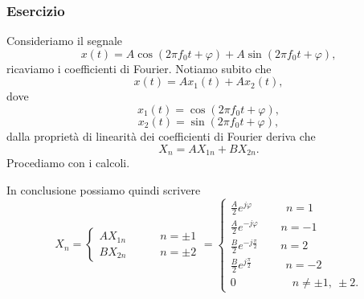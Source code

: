 \documentclass[12pt,oneside,openany]{memoir}
\numberwithin{equation}{subsection}
\begin{document}
\subsubsection{Esercizio}
Consideriamo il segnale
\begin{equation}
	x(t) = A \cos(2 \pi f_0 t + \varphi) + A \sin(2 \pi f_0 t + \varphi),
\end{equation}
ricaviamo i coefficienti di Fourier.
\bigbreak\noindent
Notiamo subito che
\begin{equation}
	x(t) = A x_1(t) + A x_2(t),
\end{equation}
dove
\begin{equation}
	x_1(t) = \cos(2 \pi f_0 t + \varphi),
\end{equation}
\begin{equation}
	x_2(t) = \sin(2 \pi f_0 t + \varphi),
\end{equation}
dalla propriet\`a di linearit\`a dei coefficienti di Fourier deriva che
\begin{equation}
	X_n = A X_{1n} + B X_{2n}.
\end{equation}
Procediamo con i calcoli.

In conclusione possiamo quindi scrivere
\begin{equation}
	X_n =
		\begin{cases}
			A X_{1n} \quad\quad\quad n = \pm 1\\
			B X_{2n} \quad\quad\quad n = \pm 2
		\end{cases}
			=
			\begin{cases}
				\frac{A}{2} e^{j \varphi} \quad\quad\quad n = 1\\
				\frac{A}{2} e^{-j \varphi} \quad\quad n = -1\\
				\frac{B}{2} e^{-j \frac{\pi}{2}} \quad\quad n = 2\\
				\frac{B}{2} e^{j \frac{\pi}{2}} \quad\quad\quad n = -2\\
				0  \quad\quad\quad\quad\quad n \neq \pm 1, \ \pm 2.
			\end{cases}
\end{equation}
\newpage
\end{document}
